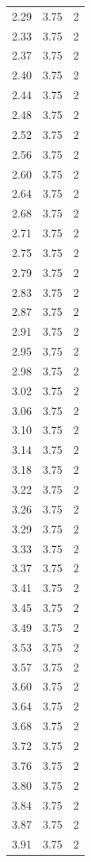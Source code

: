 \begin{longtable}{lrr}
  2.29 & 3.75 & 2 \\
  2.33 & 3.75 & 2 \\
  2.37 & 3.75 & 2 \\
  2.40 & 3.75 & 2 \\
  2.44 & 3.75 & 2 \\
  2.48 & 3.75 & 2 \\
  2.52 & 3.75 & 2 \\
  2.56 & 3.75 & 2 \\
  2.60 & 3.75 & 2 \\
  2.64 & 3.75 & 2 \\
  2.68 & 3.75 & 2 \\
  2.71 & 3.75 & 2 \\
  2.75 & 3.75 & 2 \\
  2.79 & 3.75 & 2 \\
  2.83 & 3.75 & 2 \\
  2.87 & 3.75 & 2 \\
  2.91 & 3.75 & 2 \\
  2.95 & 3.75 & 2 \\
  2.98 & 3.75 & 2 \\
  3.02 & 3.75 & 2 \\
  3.06 & 3.75 & 2 \\
  3.10 & 3.75 & 2 \\
  3.14 & 3.75 & 2 \\
  3.18 & 3.75 & 2 \\
  3.22 & 3.75 & 2 \\
  3.26 & 3.75 & 2 \\
  3.29 & 3.75 & 2 \\
  3.33 & 3.75 & 2 \\
  3.37 & 3.75 & 2 \\
  3.41 & 3.75 & 2 \\
  3.45 & 3.75 & 2 \\
  3.49 & 3.75 & 2 \\
  3.53 & 3.75 & 2 \\
  3.57 & 3.75 & 2 \\
  3.60 & 3.75 & 2 \\
  3.64 & 3.75 & 2 \\
  3.68 & 3.75 & 2 \\
  3.72 & 3.75 & 2 \\
  3.76 & 3.75 & 2 \\
  3.80 & 3.75 & 2 \\
  3.84 & 3.75 & 2 \\
  3.87 & 3.75 & 2 \\
  3.91 & 3.75 & 2 \\

\end{longtable}
